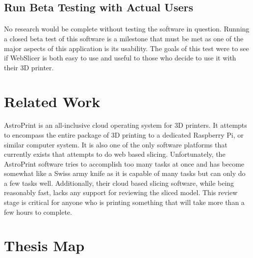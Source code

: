 \subsection{Run Beta Testing with Actual Users}
\paragraph{}
No research would be complete without testing the software in question.
Running a closed beta test of this software is a milestone that must be met as one of the major aspects of this application is its usability.
The goals of this test were to see if WebSlicer is both easy to use and useful to those who decide to use it with their 3D printer.

\section{Related Work}
\paragraph{}
AstroPrint is an all-inclusive cloud operating system for 3D printers.
It attempts to encompass the entire package of 3D printing to a dedicated Raspberry Pi, or similar computer system.
It is also one of the only software platforms that currently exists that attempts to do web based slicing.
Unfortunately, the AstroPrint software tries to accomplish too many tasks at once and has become somewhat like a Swiss army knife as it is capable of many tasks but can only do a few tasks well.
Additionally, their cloud based slicing software, while being reasonably fast, lacks any support for reviewing the sliced model.
This review stage is critical for anyone who is printing something that will take more than a few hours to complete.

\section{Thesis Map}
